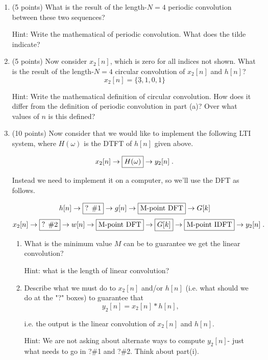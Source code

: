 \documentclass[]{siamltex}
\begin{document}
\begin{enumerate}
	\begin{enumerate} 
	\item (5 points) What is the result of the length-$N=4$ periodic convolution between these two sequences?
	
	Hint: Write the mathematical of periodic convolution. What does the tilde indicate?
	
	\vspace{3in}
	\item (5 points) Now consider $x_2[n]$, which is zero for all indices not shown. What is the result of the length-$N=4$ circular convolution of $x_2[n]$ and $h[n]$?
	\[ x_2[n] = \{\underline{3},1,0,1 \} \]
	
	Hint: Write the mathematical definition of circular convolution. How does it differ from the definition of periodic convolution in part (a)? Over what values of $n$ is this defined? 
	
	
	\newpage
	\item (10 points) Now consider that we would like to implement the following LTI system, where $H(\omega)$ is the DTFT of $h[n]$ given above.
	
	$$x_2[n]  \rightarrow \fbox{$H(\omega)$} \rightarrow y_2[n]\;.$$
	
	Instead we need to implement it on a computer, so we'll use the DFT as follows. 
	
	$$h[n] \rightarrow \fbox{? \#1} \rightarrow g[n] \rightarrow \fbox{M-point DFT} \rightarrow G[k] $$		
	$$x_2[n] \rightarrow \fbox{? \#2} \rightarrow w[n] \rightarrow \fbox{M-point DFT}  \rightarrow \fbox{$G[k]$}\rightarrow  \fbox{M-point IDFT}  \rightarrow y_2[n]\;.$$
	
		\begin{enumerate} 
		\item What is the minimum value $M$ can be to guarantee we get the linear convolution?
		
		Hint: what is the length of linear convolution?
		\vspace{.5in}
		
		\item Describe what we must do to $x_2[n]$ and/or $h[n]$ (i.e. what should we do at the "?" boxes) to guarantee that $$y_2[n] = x_2[n]*h[n],$$ 
		
		i.e. the output is the linear convolution of $x_2[n]$ and  $h[n]$.
		
		Hint: We are not asking about alternate ways to compute $y_2[n]$- just what needs to go in ?\#1 and ?\#2. Think about part(i).
		

\end{enumerate}
\end{enumerate}
\end{enumerate}
\end{document}
